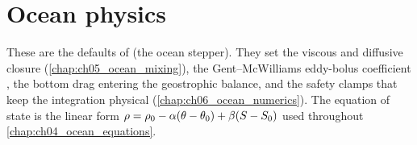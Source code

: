 
\section{Ocean physics}

These are the defaults of  (the ocean stepper). They set the
viscous and diffusive closure (\ref{chap:ch05_ocean_mixing}), the Gent--McWilliams
eddy-bolus coefficient \citep{gentmcwilliams1990}, the bottom drag entering the
geostrophic balance, and the safety clamps that keep the integration physical
(\ref{chap:ch06_ocean_numerics}). The equation of state is the linear form
$\rho = \rho_0 - \alpha(\theta - \theta_0) + \beta(S - S_0)$ used
throughout \ref{chap:ch04_ocean_equations}.

